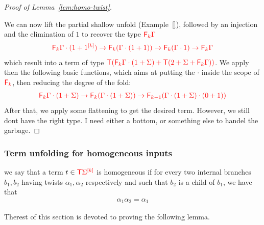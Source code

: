 \begin{proof}[Proof of Lemma~\ref{lem:homo-twist}]
\begin{center}
  \end{center}
  We can now lift the partial shallow unfold (Example~\ref{}), followed by an injection and the elimination of $1$ to recover the type $\ranked{\reduce k \Gamma}$
  \begin{align*}
  \ranked{\reduce k \Gamma\cdot(1+\mati k 1)\to \reduce k (\Gamma\cdot(1+1))\to \reduce k (\Gamma\cdot 1) \to  \reduce k \Gamma}
\end{align*}
which result into a term of type $\ranked{\tmonad(\reduce k\Gamma\cdot(1+\Sigma)+\tmonad(2+\Sigma+\reduce k \Gamma))}$. We apply then the following basic functions, which aims at putting the $\cdot$ inside the scope of $\reduce k$, then reducing the degree of the fold:
\begin{align*}
\ranked{\reduce k\Gamma\cdot(1+\Sigma)\to \reduce k(\Gamma\cdot(1+\Sigma))\to \reduce {k-1}(\Gamma\cdot(1+\Sigma)\cdot (0+1)) }
\end{align*}
After that, we apply some flattening to get the desired term. However, we still dont have the right type. I need either a bottom, or something else to handel the garbage.
\end{proof}


\subsubsection{Term unfolding for homogeneous inputs}
\label{subsec:something-homo-unfold}
we say that a term $ t \in \tmonad \mati k \rSigma$ is homogeneous if for every two internal branches $b_1, b_2$ having twists $\alpha_1, \alpha_2$ respectively and such that $b_2$ is a child of $b_1$, we have that
\begin{align*}
\alpha_1\alpha_2=\alpha_1
\end{align*}

Therest of this section is devoted to proving the following lemma. 

